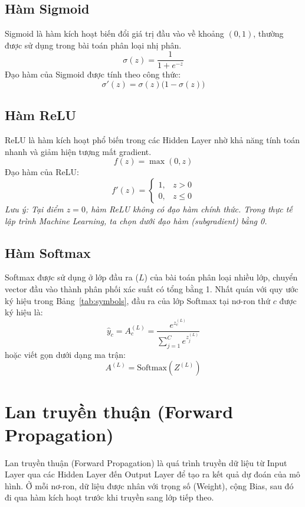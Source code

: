\documentclass[12pt,a4paper]{report}
\begin{document}
\subsection{Hàm Sigmoid}
Sigmoid là hàm kích hoạt biến đổi giá trị đầu vào về khoảng $(0,1)$, thường được sử dụng trong bài toán phân loại nhị phân.
\begin{equation}
    \sigma(z) = \frac{1}{1 + e^{-z}}
\end{equation}
Đạo hàm của Sigmoid được tính theo công thức:
\begin{equation}
    \sigma'(z) = \sigma(z)\bigl(1 - \sigma(z)\bigr)
\end{equation}

\subsection{Hàm ReLU}
ReLU là hàm kích hoạt phổ biến trong các Hidden Layer nhờ khả năng tính toán nhanh và giảm hiện tượng mất gradient.
\begin{equation}
    f(z) = \max(0, z)
\end{equation}
Đạo hàm của ReLU:
\begin{equation}
    f'(z) = \begin{cases} 1, & z > 0 \\ 0, & z \le 0 \end{cases}
\end{equation}
\textit{Lưu ý: Tại điểm $z=0$, hàm ReLU không có đạo hàm chính thức. Trong thực tế lập trình Machine Learning, ta chọn dưới đạo hàm (subgradient) bằng 0.}

\subsection{Hàm Softmax}
Softmax được sử dụng ở lớp đầu ra ($L$) của bài toán phân loại nhiều lớp, chuyển vector đầu vào thành phân phối xác suất có tổng bằng 1. Nhất quán với quy ước ký hiệu trong Bảng~\ref{tab:symbols}, đầu ra của lớp Softmax tại nơ-ron thứ $c$ được ký hiệu là:
\begin{equation}
    \hat{y}_c = A^{(L)}_c = \frac{e^{z_c^{(L)}}}{\sum_{j=1}^C e^{z_j^{(L)}}}
\end{equation}
hoặc viết gọn dưới dạng ma trận:
\begin{equation}
    A^{(L)} = \mathrm{Softmax}\!\left(Z^{(L)}\right)
\end{equation}

\section{Lan truyền thuận (Forward Propagation)}
Lan truyền thuận (Forward Propagation) là quá trình truyền dữ liệu từ Input Layer qua các Hidden Layer đến Output Layer để tạo ra kết quả dự đoán của mô hình. Ở mỗi nơ-ron, dữ liệu được nhân với trọng số (Weight), cộng Bias, sau đó đi qua hàm kích hoạt trước khi truyền sang lớp tiếp theo.
\end{document}
